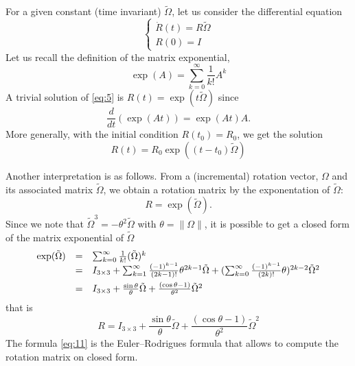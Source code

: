 For a given constant (time invariant) $\tilde \Omega$, let us consider the differential equation
\begin{equation}
  \label{eq:5}
  \begin{cases}
    \dot R(t) = R \tilde \Omega\\
    R(0) = I
  \end{cases}
\end{equation}
Let us recall the definition of the matrix exponential,
\begin{equation}
  \label{eq:6}
  \exp(A) = \sum_{k=0}^{\infty} \frac {1}{k!} A^k
\end{equation}
A trivial solution of \eqref{eq:5} is $R(t) = \exp(t\tilde\Omega) $ since
\begin{equation}
  \label{eq:7}
  \frac {d}{dt}(\exp(At)) = \exp(At) A.
\end{equation}
More generally, with the initial condition $R(t_0)= R_0$, we get the solution
\begin{equation}
R(t) = R_0 \exp((t-t_0)\tilde\Omega)\label{eq:8}
\end{equation}

Another interpretation is as follows. From a (incremental) rotation vector, $\Omega$ and its associated matrix $\tilde \Omega$, we obtain a rotation matrix by the exponentation of $\tilde \Omega$:
\begin{equation}
  \label{eq:9}
  R = \exp(\tilde\Omega).
\end{equation}
Since we note that $\tilde \Omega^ 3 = - \theta^2 \tilde \Omega$ with $\theta = \|\Omega\|$, it is possible to get a closed form of the matrix exponential of $\tilde \Omega$
\begin{equation}
  \label{eq:10}
  \begin{array}[lcl]{lcl}
    \exp(\tilde \Omega) &=& \sum_{k=0}^{\infty} \frac {1}{k!} (\tilde \Omega)^k \\
                        &=&  I_{3\times 3} + \sum_{k=1}^{\infty} \frac {(-1)^{k-1}}{(2k-1)!}  \theta ^{2k-1} \tilde \Omega + (\sum_{k=0}^{\infty} \frac {(-1)^{k-1}}{(2k)!} \theta)^{2k-2} \tilde \Omega^2\\[2mm]
                        &=&  I_{3\times 3} + \frac{\sin{\theta}} {\theta} \tilde \Omega +  \frac{(\cos{\theta}-1)}{\theta^2}\tilde \Omega^2   
  \end{array} 
\end{equation}
that is
\begin{equation}
  \label{eq:11}
  R =  I_{3\times 3} + \frac{\sin{\theta}} {\theta} \tilde \Omega +  \frac{(\cos{\theta}-1)}{\theta^2}\tilde \Omega^2  
\end{equation}
The formula \eqref{eq:11} is the Euler--Rodrigues formula that allows to compute the rotation matrix on closed form.


